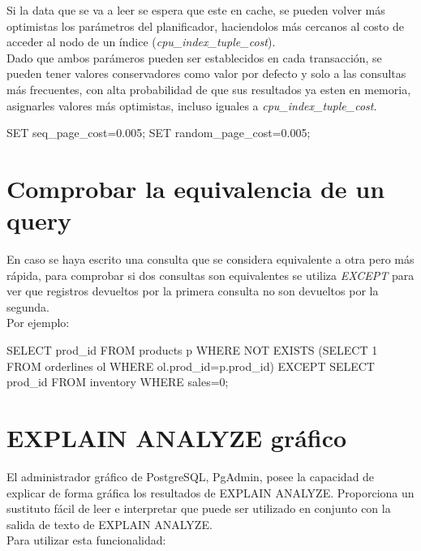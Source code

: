 Si la data que se va a leer se espera que este en cache, se pueden volver más optimistas los parámetros del planificador, haciendolos más cercanos al costo de acceder al nodo de un índice (\textit{cpu\_index\_tuple\_cost}).\\

Dado que ambos parámeros pueden ser establecidos en cada transacción, se pueden tener valores conservadores como valor por defecto y solo a las consultas más frecuentes, con alta probabilidad de que sus resultados ya esten en memoria, asignarles valores más optimistas, incluso iguales a \textit{cpu\_index\_tuple\_cost}.\\

\begin{pyglist}
SET seq_page_cost=0.005;
SET random_page_cost=0.005;
\end{pyglist}

\section{Comprobar la equivalencia de un query}

En caso se haya escrito una consulta que se considera equivalente a otra pero más rápida, para comprobar si dos consultas son equivalentes se utiliza \textit{EXCEPT} para ver que registros devueltos por la primera consulta no son devueltos por la segunda.\\

Por ejemplo:\\

\begin{pyglist}
SELECT prod_id FROM products p WHERE NOT EXISTS (SELECT 1 FROM orderlines
ol WHERE ol.prod_id=p.prod_id)
EXCEPT
SELECT prod_id FROM inventory WHERE sales=0;
\end{pyglist}


\section{EXPLAIN ANALYZE gráfico}

El administrador gráfico de PostgreSQL, PgAdmin, posee la capacidad de explicar de forma gráfica los resultados de EXPLAIN ANALYZE. Proporciona un sustituto fácil de leer e interpretar que puede ser utilizado en conjunto con la salida de texto de EXPLAIN ANALYZE.\\

Para utilizar esta funcionalidad:\\

